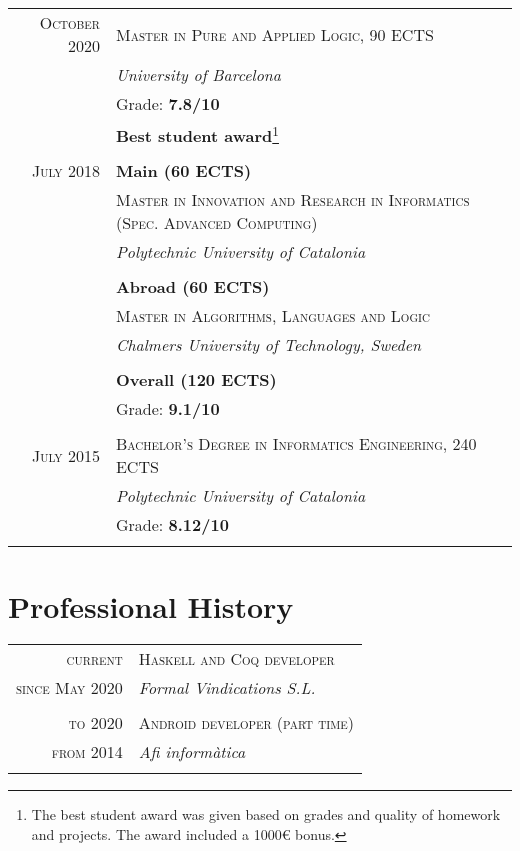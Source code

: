 \documentclass[11pt]{article}
\begin{document}
\begin{tabular}{r|p{11cm}}
  \textsc{October 2020} & \textsc{Master in Pure and Applied Logic, 90 ECTS} \\
 & \emph{University of Barcelona}\\
   & Grade: \textbf{7.8/10} \\
                        & \textbf{Best student award}\footnote{The best student award was given based on grades and quality
                            of homework and projects. The award included a 1000€ bonus.} \\
\multicolumn{2}{c}{} \\

  \textsc{July 2018} & \textbf{Main (60 ECTS)} \\
                        & \textsc{Master in Innovation and Research in Informatics (Spec. Advanced Computing)} \\
                        & \emph{Polytechnic University of Catalonia} \\
                         \\
 & \textbf{Abroad (60 ECTS)}  \\
  & \textsc{Master in Algorithms, Languages and Logic} \\
                        & \emph{Chalmers University of Technology, Sweden} \\
                        \\
                        & \textbf{Overall (120 ECTS)}  \\
                        & Grade: \textbf{9.1/10} \\
  \multicolumn{2}{c}{} \\

  \textsc{July 2015} & \textsc{Bachelor's Degree in Informatics Engineering, 240 ECTS} \\
               & \emph{Polytechnic University of Catalonia}\\
               & Grade: \textbf{8.12/10} \\
  \multicolumn{2}{c}{} \\
\end{tabular}

\section{Professional History}
\vspace{0.2cm}
\begin{tabular}{r|p{11cm}}
  \textsc{current} & \textsc{Haskell and Coq developer} \\
  \textsc{since May 2020} & \emph{Formal Vindications S.L.} \\
  \multicolumn{2}{c}{} \\
  \textsc{to 2020} & \textsc{Android developer (part time)} \\
  \textsc{from 2014} & \emph{Afi informàtica} \\
  \multicolumn{2}{c}{} \\

\end{tabular}
\end{document}
